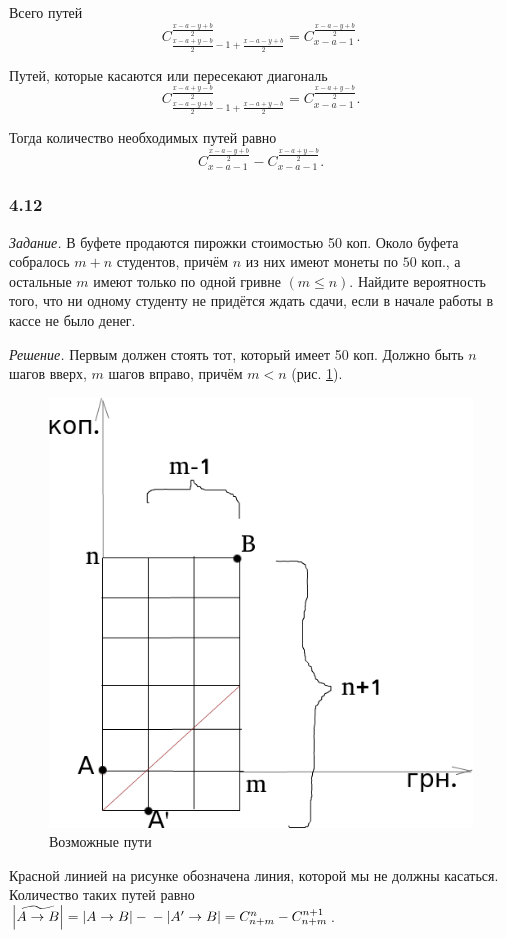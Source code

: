 \begin{enumerate}[label=\alph*)]
Всего путей
$$C_{ \frac{x-a+y-b}{2} - 1 + \frac{x-a-y+b}{2} }^{ \frac{x-a-y+b}{2} } =
C_{x-a-1}^{ \frac{x-a-y+b}{2} }.$$

Путей, которые касаются или пересекают диагональ
$$C_{ \frac{x-a-y+b}{2} - 1 + \frac{x-a+y-b}{2}}^{ \frac{x-a+y-b}{2} } =
C_{x-a-1}^{ \frac{x-a+y-b}{2} }.$$

Тогда количество необходимых путей равно
$$C_{x-a-1}^{ \frac{x-a-y+b}{2} } - C_{x-a-1}^{ \frac{x-a+y-b}{2} }.$$
\end{enumerate}

\subsubsection*{4.12}

\textit{Задание.} В буфете продаются пирожки стоимостью 50 коп.
Около буфета собралось $m+n$ студентов,
причём $n$ из них имеют монеты по $50$ коп., а остальные $m$ имеют только по одной гривне $ \left( m \leq n \right) $.
Найдите вероятность того, что ни одному студенту не придётся ждать сдачи, если в начале работы в кассе не было денег.

\textit{Решение.} Первым должен стоять тот, который имеет 50 коп.
Должно быть $n$ шагов вверх, $m$ шагов вправо, причём $m < n$ (рис. \ref{fig:412}).

\begin{figure}[h!]
  \centering
  \includegraphics[width=.5\textwidth]{./pictures/4_12.png}
  \caption{Возможные пути}
  \label{fig:412}
\end{figure}

Красной линией на рисунке обозначена линия, которой мы не должны касаться.
Количество таких путей равно
$ \left| \widetilde{A \rightarrow B} \right| =
\left| A \rightarrow B \right| - \\
- \left| A' \rightarrow B \right| =
C_{n+m}^n - C_{n+m}^{n+1}$.

